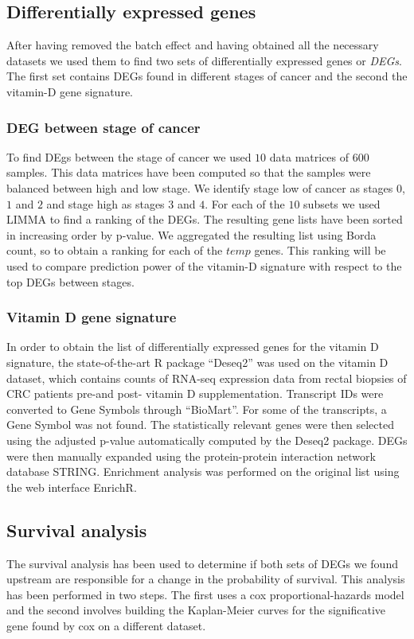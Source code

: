 \documentclass[fleqn,10pt]{SelfArx} %
\begin{document}
	\subsection{Differentially expressed genes}
	After having removed the batch effect and having obtained all the necessary datasets we used them to find two sets of differentially expressed genes or \emph{DEGs}.
	The first set contains DEGs found in different stages of cancer and the second the vitamin-D gene signature.

		\subsubsection{DEG between stage of cancer}
		To find DEgs between the stage of cancer we used $10$ data matrices of $600$ samples.
		This data matrices have been computed so that the samples were balanced between high and low stage.
		We identify stage low of cancer as stages $0$, $1$ and $2$ and stage high as stages $3$ and $4$.
		For each of the $10$ subsets we used LIMMA to find a ranking of the DEGs.
		The resulting gene lists have been sorted in increasing order by p-value.
		We aggregated the resulting list using Borda count, so to obtain a ranking for each of the $temp$ genes.
		This ranking will be used to compare prediction power of the vitamin-D signature with respect to the top DEGs between stages. 

		\subsubsection{Vitamin D gene signature}
		In order to obtain the list of differentially expressed genes for the vitamin D signature, the state-of-the-art R package “Deseq2” was used on the vitamin D dataset, which contains counts of RNA-seq expression data from rectal biopsies of CRC patients pre-and post- vitamin D supplementation. Transcript IDs were converted to Gene Symbols through “BioMart”. For some of the transcripts, a Gene Symbol was not found. The statistically relevant genes were then selected using the adjusted p-value automatically computed by the Deseq2 package. DEGs were then manually expanded using the protein-protein interaction network database STRING.
Enrichment analysis was performed on the original list using the web interface EnrichR.


	\subsection{Survival analysis}
	The survival analysis has been used to determine if both sets of DEGs we found upstream are responsible for a change in the probability of survival.
	This analysis has been performed in two steps.
	The first uses a cox proportional-hazards model and the second involves building the Kaplan-Meier curves for the significative gene found by cox on a different dataset.
\end{document}
